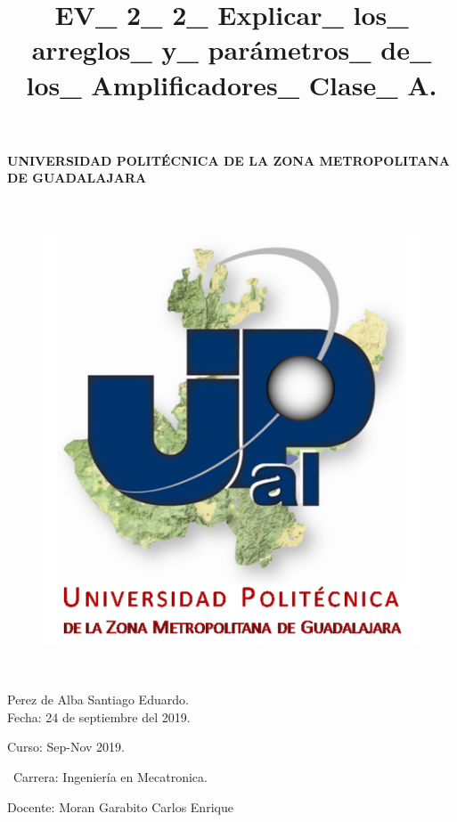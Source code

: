 \documentclass[12pt,letterpaper]{article}
\title{EV\_ 2\_ 2\_ Explicar\_ los\_ arreglos\_ y\_ parámetros\_ de\_ los\_ Amplificadores\_ Clase\_ A.}
\begin{document}
\maketitle




\paragraph{ UNIVERSIDAD POLITÉCNICA DE LA ZONA METROPOLITANA DE GUADALAJARA}

\
\begin{figure}[h!]
\begin{center}

\includegraphics[scale=0.8]{Upzmg.png} 
\label{Upzmg}


\end{center}
\end{figure}


\

\large{Perez de Alba Santiago Eduardo.\\
Fecha: 24 de septiembre del 2019.
\

Curso: Sep-Nov 2019.

\
Carrera: Ingeniería en Mecatronica.\

Docente: Moran Garabito Carlos Enrique}

\newpage
\end{document}
